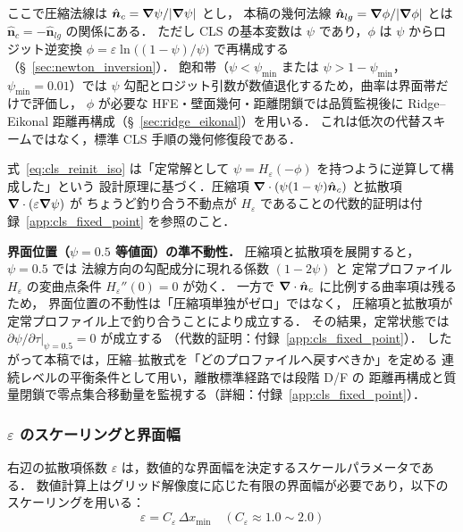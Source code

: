 ここで圧縮法線は $\hat{\bm n}_c=\bm{\nabla}\psi/|\bm{\nabla}\psi|$ とし，
本稿の幾何法線 $\hat{\bm n}_{lg}=\bm{\nabla}\phi/|\bm{\nabla}\phi|$ とは
$\hat{\bm n}_c=-\hat{\bm n}_{lg}$ の関係にある．
ただし CLS の基本変数は $\psi$ であり，$\phi$ は $\psi$ からロジット逆変換
$\phi = \varepsilon\ln\!\bigl((1-\psi)/\psi\bigr)$ で再構成する
（§~\ref{sec:newton_inversion}）．
飽和帯（$\psi < \psi_{\min}$ または $\psi > 1-\psi_{\min}$，$\psi_{\min} = 0.01$）では
$\psi$ 勾配とロジット引数が数値退化するため，曲率は界面帯だけで評価し，
$\phi$ が必要な HFE・壁面幾何・距離閉鎖では品質監視後に
Ridge--Eikonal 距離再構成（§~\ref{sec:ridge_eikonal}）を用いる．
これは低次の代替スキームではなく，標準 CLS 手順の幾何修復段である．

式~\eqref{eq:cls_reinit_iso} は「定常解として $\psi = H_\varepsilon(-\phi)$ を持つように逆算して構成した」という
設計原理に基づく．圧縮項 $\bm{\nabla}\cdot(\psi(1-\psi)\hat{\bm n}_c)$ と拡散項 $\bm{\nabla}\cdot(\varepsilon\bm{\nabla}\psi)$ が
ちょうど釣り合う不動点が $H_\varepsilon$ であることの代数的証明は付録~\ref{app:cls_fixed_point} を参照のこと．

\textbf{界面位置（$\psi=0.5$ 等値面）の準不動性．}
圧縮項と拡散項を展開すると，$\psi=0.5$ では
法線方向の勾配成分に現れる係数 $(1-2\psi)$ と
定常プロファイル $H_\varepsilon$ の変曲点条件 $H_\varepsilon''(0)=0$ が効く．
一方で $\bm{\nabla}\cdot\hat{\bm n}_c$ に比例する曲率項は残るため，
界面位置の不動性は「圧縮項単独がゼロ」ではなく，
圧縮項と拡散項が定常プロファイル上で釣り合うことにより成立する．
その結果，定常状態では $\partial\psi/\partial\tau\big|_{\psi=0.5} = 0$ が成立する
（代数的証明：付録~\ref{app:cls_fixed_point}）．
したがって本稿では，圧縮--拡散式を「どのプロファイルへ戻すべきか」を定める
連続レベルの平衡条件として用い，離散標準経路では段階 D/F の
距離再構成と質量閉鎖で零点集合移動量を監視する（詳細：付録~\ref{app:cls_fixed_point}）．

\subsubsection{\texorpdfstring{$\varepsilon$}{epsilon} のスケーリングと界面幅}

右辺の拡散項係数 $\varepsilon$ は，数値的な界面幅を決定するスケールパラメータである．
数値計算上はグリッド解像度に応じた有限の界面幅が必要であり，以下のスケーリングを用いる：
\begin{equation}
  \varepsilon = C_\varepsilon \, \Delta x_{\min} \quad (C_\varepsilon \approx 1.0 \sim 2.0)
\end{equation}

